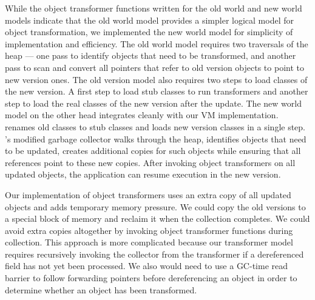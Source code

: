 While the object transformer functions written for the old world and new
world models indicate that the old world model provides a simpler logical
model for object transformation, we implemented
the new world model for simplicity of implementation and efficiency. The old world model requires
two traversals of the heap --- one pass to identify objects that need to be
transformed, and another pass to scan and convert all pointers that refer
to old version objects to point to new version ones. The old version model
also requires two steps to load classes of the new version. A first step to
load stub classes to run transformers and another step to load the real
classes of the new version after the update. The new world model on the
other head integrates cleanly with our VM implementation. \JV renames old
classes to stub classes and loads new version classes in a single step.
\JV's modified garbage collector walks through the heap, identifies objects
that need to be updated, creates additional copies for such objects while
ensuring that all references point to these new copies. After invoking
object transformers on all updated objects, the application can resume
execution in the new version.

Our implementation of object transformers uses an extra copy of all updated
objects and adds temporary memory pressure.  We  could copy the old
versions to a special block of memory and reclaim it when the collection
completes. We could avoid extra copies altogether by invoking
object transformer functions during collection.  This approach is more
complicated because our transformer model requires recursively invoking the
collector from the transformer if a dereferenced field has not yet been
processed.  We also would need to use a  GC-time read barrier to follow
forwarding pointers before dereferencing an object in order to determine
whether an object has been transformed.


